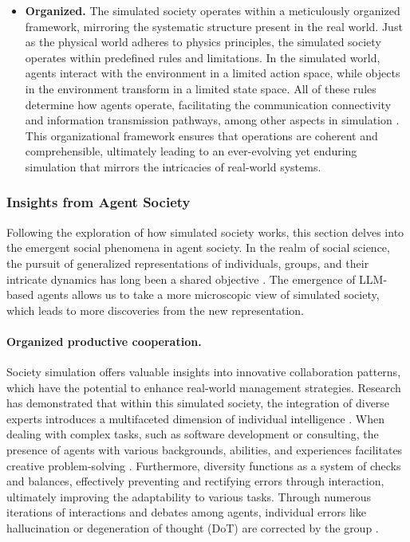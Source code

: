 \begin{itemize}[leftmargin=*]
    \item \textbf{Organized.} The simulated society operates within a meticulously organized framework, mirroring the systematic structure present in the real world. 
    Just as the physical world adheres to physics principles, the simulated society operates within predefined rules and limitations. 
    In the simulated world, agents interact with the environment in a limited action space, while objects in the environment transform in a limited state space.
    All of these rules determine how agents operate, facilitating the communication connectivity and information transmission pathways, among other aspects in simulation \cite{DBLP:journals/corr/abs-2305-17066}.
    This organizational framework ensures that operations are coherent and comprehensible, ultimately leading to an ever-evolving yet enduring simulation that mirrors the intricacies of real-world systems.
\end{itemize}

\subsubsection{Insights from Agent Society}\label{sec:insights and inspirations}
Following the exploration of how simulated society works, this section delves into the emergent social phenomena in agent society.
In the realm of social science, the pursuit of generalized representations of individuals, groups, and their intricate dynamics has long been a shared objective \cite{DBLP:journals/corr/abs-2305-03514, gilbert2018simulating}.  
The emergence of LLM-based agents allows us to take a more microscopic view of simulated society, which leads to more discoveries from the new representation.

\paragraph{Organized productive cooperation.}
Society simulation offers valuable insights into innovative collaboration patterns, which have the potential to enhance real-world management strategies. 
Research has demonstrated that within this simulated society, the integration of diverse experts introduces a multifaceted dimension of individual intelligence \cite{DBLP:journals/corr/abs-2303-17760, DBLP:journals/corr/abs-2307-05300}.
When dealing with complex tasks, such as software development or consulting, the presence of agents with various backgrounds, abilities, and experiences facilitates creative problem-solving \cite{DBLP:journals/corr/abs-2307-07924, DBLP:journals/corr/abs-2308-10848}.
Furthermore, diversity functions as a system of checks and balances, effectively preventing and rectifying errors  through interaction, ultimately improving the adaptability to various tasks.
Through numerous iterations of interactions and debates among agents, individual errors like hallucination or degeneration of thought (DoT) are corrected by the group \cite{DBLP:journals/corr/abs-2305-19118}.

